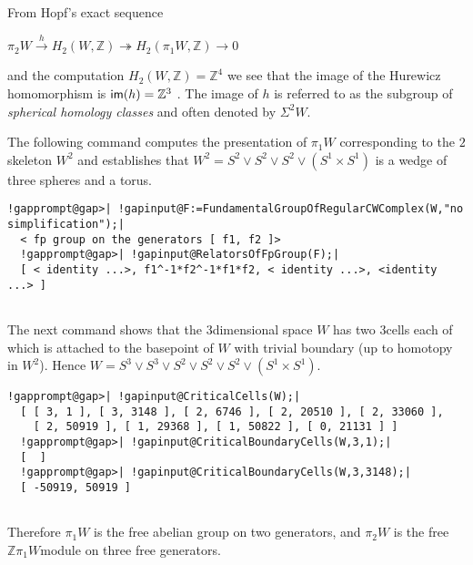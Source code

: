 \documentclass[a4paper,11pt]{report}
\begin{document}
{{From Hopf's exact sequence 

 $ \pi_2W \stackrel{h}{\longrightarrow} H_2(W,\mathbb Z) \twoheadrightarrow
H_2(\pi_1W,\mathbb Z) \rightarrow 0$ 

 and the computation $H_2(W,\mathbb Z)=\mathbb Z^4$ we see that the image of the Hurewicz homomorphism is ${\sf im}(h)= \mathbb Z^3$ . The image of $h$ is referred to as the subgroup of \emph{spherical homology classes} and often denoted by $\Sigma^2W$. 

The following command computes the presentation of $\pi_1W$ corresponding to the $2$\texttt{}skeleton $W^2$ and establishes that $W^2 = S^2\vee S^2 \vee S^2 \vee (S^1\times S^1)$ is a wedge of three spheres and a torus. 
\begin{Verbatim}[commandchars=!@|,fontsize=\small,frame=single,label=Example]
  !gapprompt@gap>| !gapinput@F:=FundamentalGroupOfRegularCWComplex(W,"no simplification");|
  < fp group on the generators [ f1, f2 ]>
  !gapprompt@gap>| !gapinput@RelatorsOfFpGroup(F);|
  [ < identity ...>, f1^-1*f2^-1*f1*f2, < identity ...>, <identity ...> ]
  
\end{Verbatim}
 

The next command shows that the $3$\texttt{}dimensional space $W$ has two $3$\texttt{}cells each of which is attached to the
base\texttt{}point of $W$ with trivial boundary (up to homotopy in $W^2$). Hence $W = S^3\vee S^3\vee S^2 \vee S^2 \vee S^2 \vee (S^1\times S^1)$. 
\begin{Verbatim}[commandchars=!@|,fontsize=\small,frame=single,label=Example]
  !gapprompt@gap>| !gapinput@CriticalCells(W);|
  [ [ 3, 1 ], [ 3, 3148 ], [ 2, 6746 ], [ 2, 20510 ], [ 2, 33060 ], 
    [ 2, 50919 ], [ 1, 29368 ], [ 1, 50822 ], [ 0, 21131 ] ]
  !gapprompt@gap>| !gapinput@CriticalBoundaryCells(W,3,1);|
  [  ]
  !gapprompt@gap>| !gapinput@CriticalBoundaryCells(W,3,3148);|
  [ -50919, 50919 ]
  
\end{Verbatim}
 

 Therefore $\pi_1W$ is the free abelian group on two generators, and $\pi_2W$ is the free $\mathbb Z\pi_1W$\texttt{}module on three free generators. }

 }

 
\end{document}
